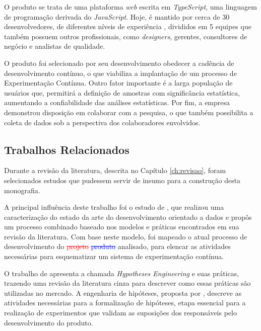 O produto se trata de uma plataforma \textit{web} escrita em \textit{TypeScript}, uma linguagem de programação derivada do \textit{JavaScript}. Hoje, é mantido por cerca de 30 desenvolvedores, de diferentes níveis de experiência , divididos em 5 equipes que também possuem outros profissionais, como \textit{designers}, gerentes, consultores de negócio e analistas de qualidade.

O produto foi selecionado por seu desenvolvimento obedecer a cadência de desenvolvimento contínuo, o que viabiliza a implantação de um processo de Experimentação Contínua. Outro fator importante é a larga população de usuários que, permitirá a definição de amostras com significância estatística, aumentando a confiabilidade das análises estatísticas. Por fim, a empresa demonstrou disposição em colaborar com a pesquisa, o que também possibilita a coleta de dados sob a perspectiva dos colaboradores envolvidos. 


\subsection{Trabalhos Relacionados}

Durante a revisão da literatura, descrita no Capítulo \ref{ch:revisao}, foram selecionados estudos que pudessem servir de insumo para a construção desta monografia.

A principal influência deste trabalho foi o estudo de , que realizou uma caracterização do estado da arte do desenvolvimento orientado a dados e propôs um processo combinado baseado nos modelos e práticas encontrados em sua revisão da literatura. Com base neste modelo, foi mapeado o atual processo de desenvolvimento do \textcolor{red}{\st{projeto}} \textcolor{blue}{\st{produto}} analisado, para elencar as atividades necessárias para esquematizar um sistema de experimentação contínua.

O trabalho de  apresenta a chamada \textit{Hypotheses Engineering} e suas práticas, trazendo uma revisão da literatura cinza para descrever como essas práticas são utilizadas no mercado. A engenharia de hipóteses, proposta por , descreve as atividades necessárias para a formalização de hipóteses, etapa essencial para a realização de experimentos que validam as suposições dos responsáveis pelo desenvolvimento do produto.

